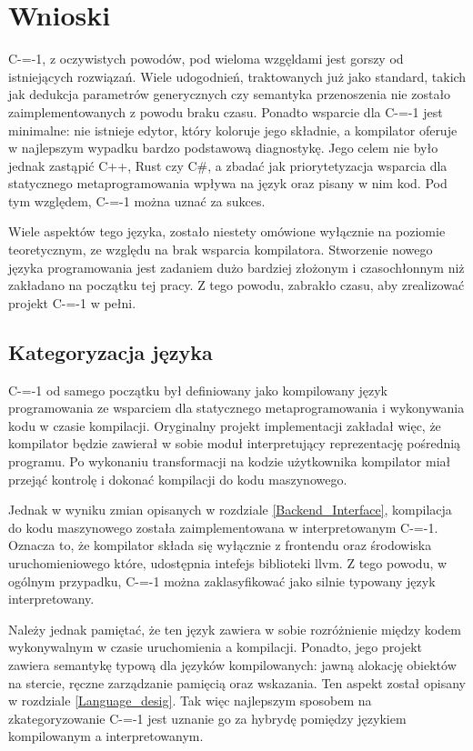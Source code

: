 \section{Wnioski}

C-=-1, z oczywistych powodów, pod wieloma wzgęldami jest gorszy od istniejących rozwiązań.
Wiele udogodnień, traktowanych już jako standard, takich jak dedukcja parametrów generycznych czy semantyka przenoszenia nie zostało zaimplementowanych z powodu braku czasu.
Ponadto wsparcie dla C-=-1 jest minimalne: nie istnieje edytor, który koloruje jego składnie, a kompilator oferuje w najlepszym wypadku bardzo podstawową diagnostykę.
Jego celem nie było jednak zastąpić C++, Rust czy C\#, a zbadać jak priorytetyzacja wsparcia dla statycznego metaprogramowania wpływa na język oraz pisany w nim kod. 
Pod tym względem, C-=-1 można uznać za sukces.

Wiele aspektów tego języka, zostało niestety omówione wyłącznie na poziomie teoretycznym, ze względu na brak wsparcia kompilatora.
Stworzenie nowego języka programowania jest zadaniem dużo bardziej złożonym i czasochłonnym niż zakładano na początku tej pracy.
Z tego powodu, zabrakło czasu, aby zrealizować projekt C-=-1 w pełni.


\subsection{Kategoryzacja języka}

C-=-1 od samego początku był definiowany jako kompilowany język programowania ze wsparciem dla statycznego metaprogramowania i wykonywania kodu w czasie kompilacji.
Oryginalny projekt implementacji zakładał więc, że kompilator będzie zawierał w sobie moduł interpretujący reprezentację pośrednią programu.
Po wykonaniu transformacji na kodzie użytkownika kompilator miał przejąć kontrolę i dokonać kompilacji do kodu maszynowego.

Jednak w wyniku zmian opisanych w rozdziale \ref{Backend_Interface}, kompilacja do kodu maszynowego została zaimplementowana w interpretowanym C-=-1.
Oznacza to, że kompilator składa się wyłącznie z frontendu oraz środowiska uruchomieniowego które, udostępnia intefejs biblioteki llvm.
Z tego powodu, w ogólnym przypadku, C-=-1 można zaklasyfikować jako silnie typowany język interpretowany.

Należy jednak pamiętać, że ten język zawiera w sobie rozróżnienie między kodem wykonywalnym w czasie uruchomienia a kompilacji.
Ponadto, jego projekt zawiera semantykę typową dla języków kompilowanych: jawną alokację obiektów na stercie, ręczne zarządzanie pamięcią oraz wskazania. 
Ten aspekt został opisany w rozdziale \ref{Language_desig}.
Tak więc najlepszym sposobem na zkategoryzowanie C-=-1 jest uznanie go za hybrydę pomiędzy językiem kompilowanym a interpretowanym.


